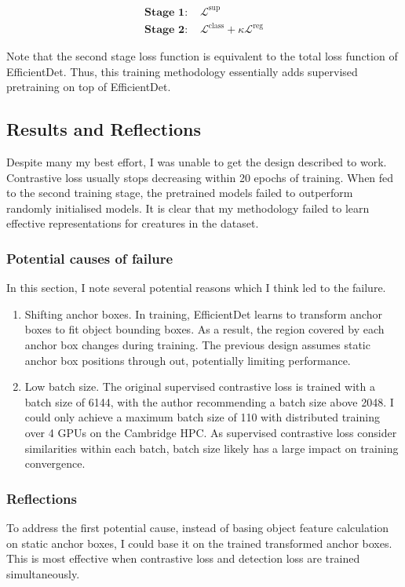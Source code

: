 \documentclass[12pt,a4paper,twoside,openright]{report}
\newcommand{\suploss}{\mathcal{L}^\text{sup}}
\newcommand{\clsloss}{\mathcal{L}^\text{class}}
\newcommand{\regloss}{\mathcal{L}^\text{reg}}
\begin{document}
\begin{align*}
    \textbf{Stage 1: }& \suploss\\
    \textbf{Stage 2: }& \clsloss + \kappa \regloss
\end{align*}

Note that the second stage loss function is equivalent to the total loss function of EfficientDet. Thus, this training methodology essentially adds supervised pretraining on top of EfficientDet.

\subsection{Results and Reflections}
Despite many my best effort, I was unable to get the design described to work. Contrastive loss usually stops decreasing within 20 epochs of training. When fed to the second training stage, the pretrained models failed to outperform randomly initialised models. It is clear that my methodology failed to learn effective representations for creatures in the dataset.

\subsubsection{Potential causes of failure}
In this section, I note several potential reasons which I think led to the failure.
\begin{enumerate}
    \item Shifting anchor boxes. In training, EfficientDet learns to transform anchor boxes to fit object bounding boxes. As a result, the region covered by each anchor box changes during training. The previous design assumes static anchor box positions through out, potentially limiting performance.
    \item Low batch size. The original supervised contrastive loss \cite{khosla_supervised_2021} is trained with a batch size of 6144, with the author recommending a batch size above 2048. I could only achieve a maximum batch size of 110 with distributed training over 4 GPUs on the Cambridge HPC. As supervised contrastive loss consider similarities within each batch, batch size likely has a large impact on training convergence.
    
\end{enumerate}

\subsubsection{Reflections}
To address the first potential cause, instead of basing object feature calculation on static anchor boxes, I could base it on the trained transformed anchor boxes. This is most effective when contrastive loss and detection loss are trained simultaneously.
\end{document}
